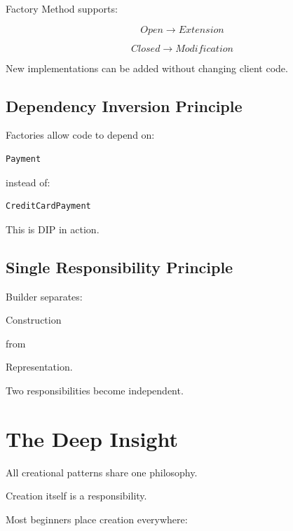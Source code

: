 \documentclass[11pt,a4paper]{book}
\begin{document}
Factory Method supports:

\[
Open
\rightarrow
Extension
\]

\[
Closed
\rightarrow
Modification
\]

New implementations can be added without
changing client code.


\subsection*{Dependency Inversion Principle}

Factories allow code to depend on:

\begin{verbatim}
Payment
\end{verbatim}

instead of:

\begin{verbatim}
CreditCardPayment
\end{verbatim}

This is DIP in action.


\subsection*{Single Responsibility Principle}

Builder separates:

Construction

from

Representation.

Two responsibilities become independent.


\section{The Deep Insight}

\begin{idea}

All creational patterns share one philosophy.

\end{idea}

Creation itself is a responsibility.

Most beginners place creation everywhere:
\end{document}

